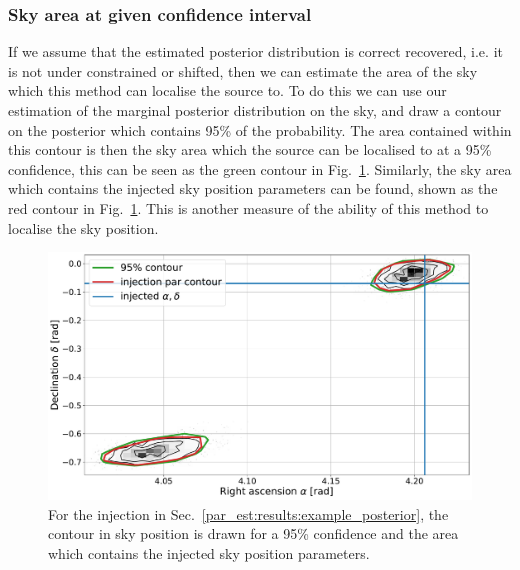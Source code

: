 \subsubsection{Sky area at given confidence interval}

If we assume that the estimated posterior distribution is correct recovered, i.e. it is not under constrained or shifted, then we can estimate the area of the sky which this method can localise the source to. 
To do this we can use our estimation of the marginal posterior distribution on the sky, and draw a contour on the posterior which contains 95\% of the probability.
The area contained within this contour is then the sky area which the source can be localised to at a 95\% confidence, this can be seen as the green contour in Fig.~\ref{par_est:results:sky_area_example}.
Similarly, the sky area which contains the injected sky position parameters can be found, shown as the red contour in Fig.~\ref{par_est:results:sky_area_example}.
This is another measure of the ability of this method to localise the sky position.
%
\begin{figure}[ht]
    \centering
    \includegraphics[width=\linewidth]{C5_parameter/skyarea_example.pdf}
    \caption[Area of sky at 95\% confidence]{For the injection in Sec.~\ref{par_est:results:example_posterior}, the contour in sky position is drawn for a 95\% confidence and the area which contains the injected sky position parameters.}
    \label{par_est:results:sky_area_example}
\end{figure}

